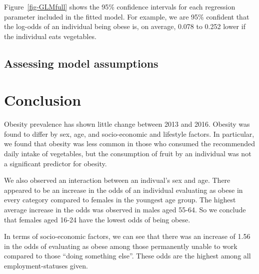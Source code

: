 \documentclass[
  letterpaper,
  DIV=11,
  numbers=noendperiod]{scrartcl}
\begin{document}
Figure~\ref{fig-GLMfull} shows the 95\% confidence intervals for each
regression parameter included in the fitted model. For example, we are
95\% confident that the log-odds of an individual being obese is, on
average, 0.078 to 0.252 lower if the individual eats vegetables.

\subsection{Assessing model
assumptions}\label{assessing-model-assumptions}

\section{Conclusion}\label{sec-conclusion}

Obesity prevalence has shown little change between 2013 and 2016.
Obesity was found to differ by sex, age, and socio-economic and
lifestyle factors. In particular, we found that obesity was less common
in those who consumed the recommended daily intake of vegetables, but
the consumption of fruit by an individual was not a significant
predictor for obesity.

We also observed an interaction between an indivual's sex and age. There
appeared to be an increase in the odds of an individual evaluating as
obese in every category compared to females in the youngest age group.
The highest average increase in the odds was observed in males aged
55-64. So we conclude that females aged 16-24 have the lowest odds of
being obese.

In terms of socio-economic factors, we can see that there was an
increase of 1.56 in the odds of evaluating as obese among those
permanently unable to work compared to those ``doing something else''.
These odds are the highest among all employment-statuses given.
\end{document}
